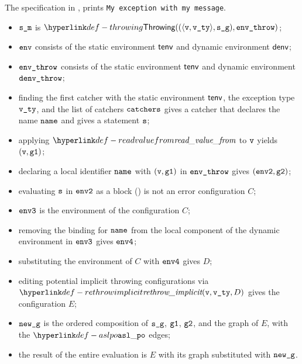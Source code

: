 The specification in , prints \texttt{My exception with my message}.

\ProseParagraph
\AllApply
\begin{itemize}
  \item $\texttt{s\_m}$ is $\Throwing((\langle \vv, \vvty \rangle, \sg), \envthrow)$;
  \item $\texttt{env}$ consists of the static environment $\textsf{tenv}$ and dynamic environment $\textsf{denv}$;
  \item $\texttt{env\_throw}$ consists of the static environment $\textsf{tenv}$ and dynamic environment \\ $\texttt{denv\_throw}$;
  \item finding the first catcher with the static environment $\textsf{tenv}$, the exception type $\texttt{v\_ty}$,
  and the list of catchers $\texttt{catchers}$ gives a catcher that declares the name $\texttt{name}$ and gives a statement $\texttt{s}$;
  \item applying $\readvaluefrom$ to $\texttt{v}$ yields $(\texttt{v}, \texttt{g1})$;
  \item declaring a local identifier $\texttt{name}$ with $(\texttt{v}, \texttt{g1})$ in $\texttt{env\_throw}$ gives $(\texttt{env2}, \texttt{g2})$;
  \item evaluating $\texttt{s}$ in $\texttt{env2}$ as a block () is not an error
  configuration $C$\ProseOrError;
  \item $\texttt{env3}$ is the environment of the configuration $C$;
  \item removing the binding for $\texttt{name}$ from the local component of the dynamic environment in $\texttt{env3}$
  gives $\texttt{env4}$;
  \item substituting the environment of $C$ with $\texttt{env4}$ gives $D$;
  \item editing potential implicit throwing configurations via $\rethrowimplicit(\vv, \vvty, D)$
  gives the configuration $E$;
  \item $\texttt{new\_g}$ is the ordered composition of $\texttt{s\_g}$, $\texttt{g1}$, $\texttt{g2}$, and the graph of $E$,
  with the $\aslpo$ edges;
  \item the result of the entire evaluation is $E$ with its graph substituted with $\texttt{new\_g}$.
\end{itemize}
\FormallyParagraph
